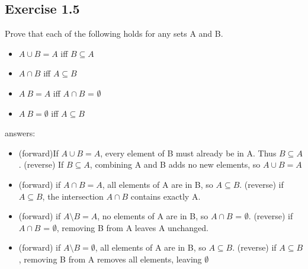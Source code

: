 \documentclass[12pt]{article}
\begin{document}
		\subsection*{Exercise 1.5}
			Prove that each of the following holds for any sets A and B.
			\begin{itemize}
				\item $A \cup B = A$ iff $B \subseteq A$
				\item $A \cap B$ iff $A \subseteq B$
				\item $A \ B = A$ iff $A \cap B$ = $\emptyset$
				\item $A \ B = \emptyset$ iff $A \subseteq B$
			\end{itemize}
			answers:
			\begin{itemize}
				\item (forward)If $A \cup B = A$, every element of B must already be in A. Thus $B \subseteq A$. (reverse) If $B \subseteq A$, combining A and B adds no new elements, so $A \cup B = A$
				\item (forward) if $A \cap B = A$, all elements of A are in B, so $A \subseteq B$. (reverse) if $A \subseteq B$, the intersection $A \cap B$ contains exactly A.
				\item (forward) if $A \setminus B = A$, no elements of A are in B, so $A \cap B$ = $\emptyset$. (reverse) if $A \cap B$ = $\emptyset$, removing B from A leaves A unchanged.
				\item (forward) if $A \setminus B = \emptyset$, all elements of A are in B, so $A \subseteq B$. (reverse) if $A \subseteq B$, removing B from A removes all elements, leaving $\emptyset$
			\end{itemize}
\end{document}

